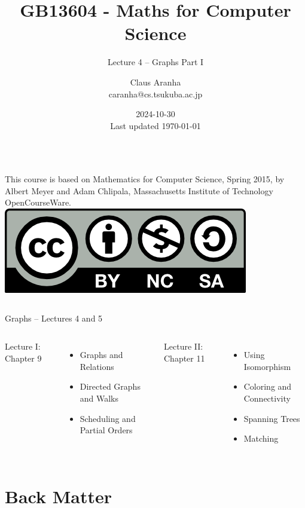 \documentclass[aspectratio=169]{beamer}
\title[GB13604]{GB13604 - Maths for Computer Science}
\subtitle[]{Lecture 4 -- Graphs Part I}
\author[Claus Aranha]{Claus Aranha\\{\footnotesize caranha@cs.tsukuba.ac.jp}}
\institute[COINS]{College of Information Science}
\date[2024-10-30]{2024-10-30\\{\tiny Last updated \today}}
\begin{document}
\begin{frame}
  \maketitle

  \begin{columns}
    {\smaller This course is based on Mathematics for Computer Science, Spring
    2015, by Albert Meyer and Adam Chlipala, Massachusetts Institute
    of Technology OpenCourseWare.}
    \includegraphics[width=\textwidth]{../img/by-nc-sa}
  \end{columns}
\end{frame}

\begin{frame}{Graphs -- Lectures 4 and 5}
  \begin{columns}
    \begin{center}
      Lecture I: Chapter 9
    \end{center}
    \begin{itemize}
      \item Graphs and Relations
      \item Directed Graphs and Walks
      \item Scheduling and Partial Orders
    \end{itemize}

    \begin{center}
      Lecture II: Chapter 11
    \end{center}
    \begin{itemize}
    \item Using Isomorphism
    \item Coloring and Connectivity
    \item Spanning Trees
    \item Matching
    \end{itemize}
  \end{columns}
\end{frame}






\section{Back Matter}

\end{document}
